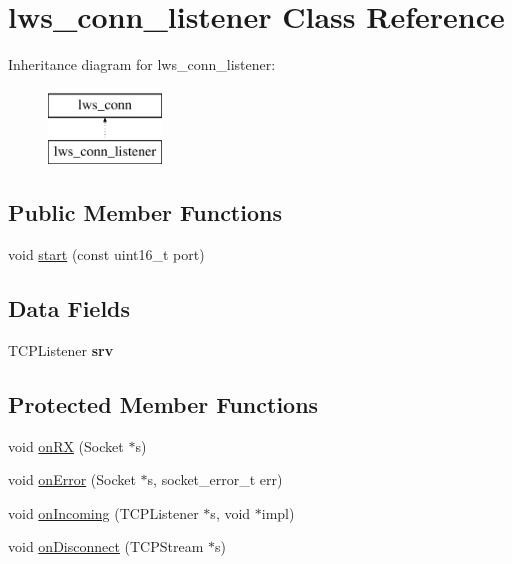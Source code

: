 \hypertarget{classlws__conn__listener}{}\section{lws\+\_\+conn\+\_\+listener Class Reference}
\label{classlws__conn__listener}
Inheritance diagram for lws\+\_\+conn\+\_\+listener\+:\begin{figure}[H]
\begin{center}
\leavevmode
\includegraphics[height=2.000000cm]{classlws__conn__listener}
\end{center}
\end{figure}
\subsection*{Public Member Functions}
\begin{DoxyCompactItemize}
\item 
void \hyperlink{classlws__conn__listener_a3c19c314f2ea2b758407b4041e4c4010}{start} (const uint16\+\_\+t port)
\end{DoxyCompactItemize}
\subsection*{Data Fields}
\begin{DoxyCompactItemize}
\item 
T\+C\+P\+Listener {\bfseries srv}\hypertarget{classlws__conn__listener_aa7076f8965bb9df268798fd9a0283374}{}\label{classlws__conn__listener_aa7076f8965bb9df268798fd9a0283374}

\end{DoxyCompactItemize}
\subsection*{Protected Member Functions}
\begin{DoxyCompactItemize}
\item 
void \hyperlink{classlws__conn__listener_ab3bc839797ba14554ac70ad09fd155c7}{on\+RX} (Socket $\ast$s)
\item 
void \hyperlink{classlws__conn__listener_a271ac4f8ad5770b3bc96cce5b265b72c}{on\+Error} (Socket $\ast$s, socket\+\_\+error\+\_\+t err)
\item 
void \hyperlink{classlws__conn__listener_ab432a456c3a961ec562e06141897806b}{on\+Incoming} (T\+C\+P\+Listener $\ast$s, void $\ast$impl)
\item 
void \hyperlink{classlws__conn__listener_aab3c7bf550a8f15d20f1e093125c2e60}{on\+Disconnect} (T\+C\+P\+Stream $\ast$s)
\end{DoxyCompactItemize}


